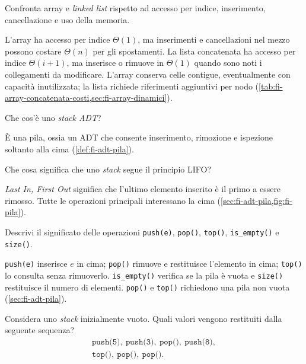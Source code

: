 \begin{exercise}
\label{ex:fi-esercizi-strutture-dati-confronto-array-linked}
Confronta array e \emph{linked list} rispetto ad accesso per indice,
inserimento, cancellazione e uso della memoria.
\end{exercise}

L'array ha accesso per indice \(\Theta(1)\), ma inserimenti e cancellazioni nel
mezzo possono costare \(\Theta(n)\) per gli spostamenti. La lista concatenata ha
accesso per indice \(\Theta(i+1)\), ma inserisce o rimuove in \(\Theta(1)\)
quando sono noti i collegamenti da modificare. L'array conserva celle contigue,
eventualmente con capacità inutilizzata; la lista richiede riferimenti
aggiuntivi per nodo
(\cref{tab:fi-array-concatenata-costi,sec:fi-array-dinamici}).

\begin{exercise}
\label{ex:fi-esercizi-strutture-dati-stack-definizione}
Che cos'è uno \emph{stack ADT}?
\end{exercise}

È una pila, ossia un ADT che consente inserimento, rimozione e ispezione
soltanto alla cima (\cref{def:fi-adt-pila}).

\begin{exercise}
\label{ex:fi-esercizi-strutture-dati-stack-lifo}
Che cosa significa che uno \emph{stack} segue il principio LIFO?
\end{exercise}

\emph{Last In, First Out} significa che l'ultimo elemento inserito è il primo a
essere rimosso. Tutte le operazioni principali interessano la cima
(\cref{sec:fi-adt-pila,fig:fi-pila}).

\begin{exercise}
\label{ex:fi-esercizi-strutture-dati-stack-operazioni}
Descrivi il significato delle operazioni \texttt{push(e)}, \texttt{pop()},
\texttt{top()}, \texttt{is\_empty()} e \texttt{size()}.
\end{exercise}

\texttt{push(e)} inserisce \(e\) in cima; \texttt{pop()} rimuove e
restituisce l'elemento in cima; \texttt{top()} lo consulta senza rimuoverlo.
\texttt{is\_empty()}
verifica se la pila è vuota e \texttt{size()} restituisce il numero di elementi.
\texttt{pop()} e \texttt{top()} richiedono una pila non vuota
(\cref{sec:fi-adt-pila}).

\begin{exercise}
\label{ex:fi-esercizi-strutture-dati-stack-traccia}
Considera uno \emph{stack} inizialmente vuoto. Quali valori vengono restituiti
dalla seguente sequenza?
\[
\begin{gathered}
  \texttt{push(5)},\ \texttt{push(3)},\ \texttt{pop()},\ \texttt{push(8)},\\
  \texttt{top()},\ \texttt{pop()},\ \texttt{pop()}.
\end{gathered}
\]
\end{exercise}

